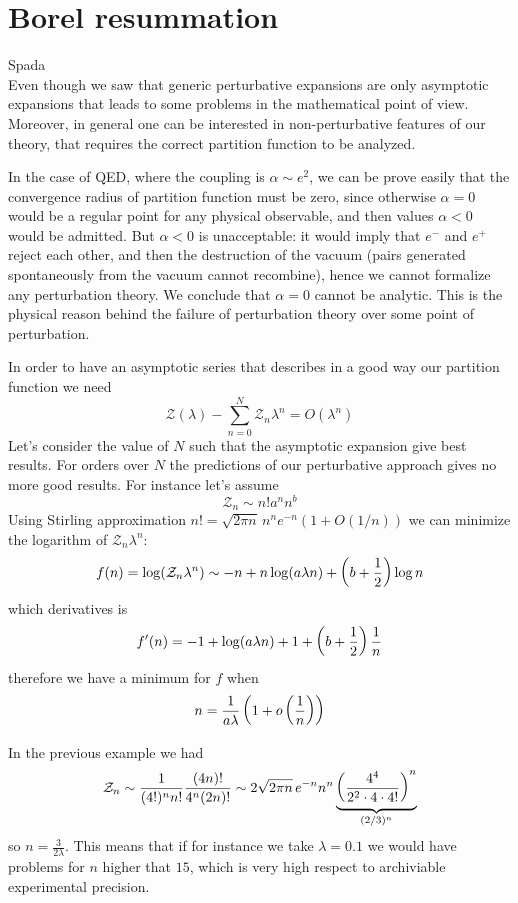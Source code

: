 \documentclass[../main/main.tex]{subfiles}
\begin{document}
\section{Borel resummation}

\textsf{Spada~\cite{Spada:2018aa}}\\

Even though we saw that generic perturbative expansions are only asymptotic expansions that leads to some problems in the mathematical point of view. Moreover, in general one can be interested in non-perturbative features of our theory, that requires the correct partition function to be analyzed. 

In the case of QED, where the coupling is $\alpha\sim e^2$, we can be prove easily that the convergence radius of partition function must be zero, since otherwise $\alpha=0$ would be a regular point for any physical observable, and then values $\alpha<0$ would be admitted. But $\alpha<0$ is unacceptable: it would imply that $e^-$ and $e^+$  reject each other, and then the destruction of the vacuum (pairs generated spontaneously from the vacuum cannot recombine), hence we cannot formalize any perturbation theory. We conclude that $\alpha=0$ cannot be analytic. This is the physical reason behind the failure of perturbation theory over some point of perturbation.  

In order to have an asymptotic series that describes in a good way our partition function we need
\[\mathcal Z(\lambda)-\sum_{n=0}^N\mathcal Z_n\lambda^n
=O(\lambda^n)\]
Let's consider the value of $N$ such that the asymptotic expansion give best results. For orders over $N$ the predictions of our perturbative approach gives no more good results. For instance let's assume
\[\mathcal Z_n\sim n!a^nn^b\]
Using Stirling approximation $n!=\sqrt{2\pi n}\,n^ne^{-n}(1+O(1/n))$ we can minimize the logarithm of $\mathcal Z_n\lambda^n$:
\[f(n)=\log(\mathcal Z_n\lambda^n)\sim-n+n\log(a\lambda n)+\left(b+\frac12\right)\log n\]
which derivatives is
\[f'(n)=-1+\log(a\lambda n)+1+\left(b+\frac12\right)\frac1n\]
therefore we have a minimum for $f$ when
\[n=\frac1{a\lambda}\left(1+o\left(\frac1n\right)\right)\]

In the previous example we had
\[\mathcal Z_n\sim \frac1{(4!)^nn!}\frac{(4n)!}{4^n(2n)!}\sim{2}{\sqrt{2\pi n}}\,e^{-n}n^n\underbrace{\left(\frac{4^4}{2^2\cdot4\cdot4!}\right)^n}_{(2/3)^n}\]
so $n=\frac3{2\lambda}$. This means that if for instance we take $\lambda=0.1$ we would have problems for $n$ higher that $15$, which is very high respect to archiviable experimental precision.  
\end{document}
